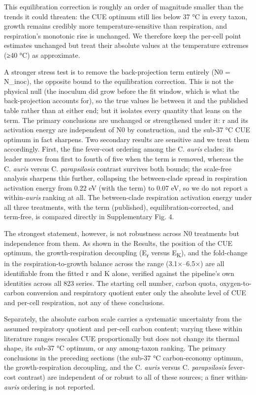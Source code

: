 \documentclass[
]{article}
\begin{document}
This equilibration correction is roughly an order of magnitude smaller
than the trends it could threaten: the CUE optimum still lies below 37
°C in every taxon, growth remains credibly more temperature-sensitive
than respiration, and respiration's monotonic rise is unchanged. We
therefore keep the per-cell point estimates unchanged but treat their
absolute values at the temperature extremes (≥40 °C) as approximate.

A stronger stress test is to remove the back-projection term entirely
(N0 = N\_inoc), the opposite bound to the equilibration correction. This
is not the physical null (the inoculum did grow before the fit window,
which is what the back-projection accounts for), so the true values lie
between it and the published table rather than at either end; but it
isolates every quantity that leans on the term. The primary conclusions
are unchanged or strengthened under it: r and its activation energy are
independent of N0 by construction, and the sub-37 °C CUE optimum in fact
sharpens. Two secondary results are sensitive and we treat them
accordingly. First, the fine fever-cost ordering among the C.
\emph{auris} clades: its leader moves from first to fourth of five when
the term is removed, whereas the C. \emph{auris} versus C.
\emph{parapsilosis} contrast survives both bounds; the scale-free
analysis sharpens this further, collapsing the between-clade spread in
respiration activation energy from 0.22 eV (with the term) to 0.07 eV,
so we do not report a within-\emph{auris} ranking at all. The
between-clade respiration activation energy under all three treatments,
with the term (published), equilibration-corrected, and term-free, is
compared directly in Supplementary Fig. 4.

The strongest statement, however, is not robustness across N0 treatments
but independence from them. As shown in the Results, the position of the
CUE optimum, the growth-respiration decoupling (E\textsubscript{r}
versus E\textsubscript{K}), and the fold-change in the
respiration-to-growth balance across the range (3.1×--6.5×) are all
identifiable from the fitted r and K alone, verified against the
pipeline's own identities across all 823 series. The starting cell
number, carbon quota, oxygen-to-carbon conversion and respiratory
quotient enter only the absolute level of CUE and per-cell respiration,
not any of these conclusions.

Separately, the absolute carbon scale carries a systematic uncertainty
from the assumed respiratory quotient and per-cell carbon content;
varying these within literature ranges rescales CUE proportionally but
does not change its thermal shape, its sub-37 °C optimum, or any
among-taxon ranking. The primary conclusions in the preceding sections
(the sub-37 °C carbon-economy optimum, the growth-respiration
decoupling, and the C. \emph{auris} versus C. \emph{parapsilosis}
fever-cost contrast) are independent of or robust to all of these
sources; a finer within-\emph{auris} ordering is not reported.
\end{document}
